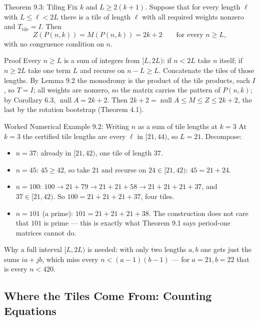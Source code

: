 \documentclass[11pt]{article}
\begin{document}
\begin{thmbox}{Theorem 9.3: Tiling}
Fix $k$ and $L\ge2(k+1)$. Suppose that for every length $\ell$ with $L\le\ell<2L$ there is a tile of length $\ell$ with all required weights nonzero and $T_{\text{tile}}=I$. Then
\begin{equation}
  Z(P(n,k))=M(P(n,k))=2k+2\qquad\text{for every }n\ge L,
\end{equation}
with no congruence condition on $n$.
\end{thmbox}

\begin{defbox}{Proof}
Every $n\ge L$ is a sum of integers from $[L,2L)$: if $n<2L$ take $n$ itself; if $n\ge2L$ take one term $L$ and recurse on $n-L\ge L$. Concatenate the tiles of those lengths. By Lemma 9.2 the monodromy is the product of the tile products, each $I$, so $T=I$; all weights are nonzero, so the matrix carries the pattern of $P(n,k)$; by Corollary 6.3, $\operatorname{null}A=2k+2$. Then $2k+2=\operatorname{null}A\le M\le Z\le2k+2$, the last by the rotation bootstrap (Theorem 4.1). \qedhere
\end{defbox}

\begin{callbox}{Worked Numerical Example 9.2: Writing $n$ as a sum of tile lengths at $k=3$}
At $k=3$ the certified tile lengths are every $\ell$ in $[21,44)$, so $L=21$. Decompose:
\begin{itemize}[leftmargin=*,nosep]
  \item $n=37$: already in $[21,42)$, one tile of length $37$.
  \item $n=45$: $45\ge42$, so take $21$ and recurse on $24\in[21,42)$: $45=21+24$.
  \item $n=100$: $100\to21+79\to21+21+58\to21+21+21+37$, and $37\in[21,42)$. So $100=21+21+21+37$, four tiles.
  \item $n=101$ (a prime): $101=21+21+21+38$. The construction does not care that $101$ is prime --- this is exactly what Theorem 9.1 says period-one matrices cannot do.
\end{itemize}
Why a full interval $[L,2L)$ is needed: with only two lengths $a,b$ one gets just the sums $ia+jb$, which miss every $n<(a-1)(b-1)$ --- for $a=21,b=22$ that is every $n<420$.
\end{callbox}

\subsection{Where the Tiles Come From: Counting Equations}
\end{document}
